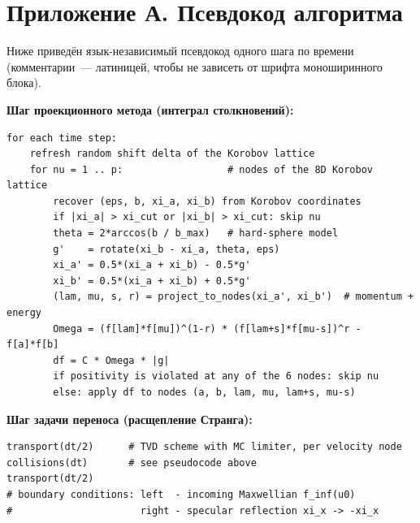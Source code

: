 \chapter*{Приложение А. Псевдокод алгоритма} %

Ниже приведён язык-независимый псевдокод одного шага по времени (комментарии~--- латиницей, чтобы не зависеть от шрифта
моноширинного блока). %

\medskip
\noindent\textbf{Шаг проекционного метода (интеграл столкновений):}
{\footnotesize
\begin{verbatim}
for each time step:
    refresh random shift delta of the Korobov lattice
    for nu = 1 .. p:                  # nodes of the 8D Korobov lattice
        recover (eps, b, xi_a, xi_b) from Korobov coordinates
        if |xi_a| > xi_cut or |xi_b| > xi_cut: skip nu
        theta = 2*arccos(b / b_max)   # hard-sphere model
        g'    = rotate(xi_b - xi_a, theta, eps)
        xi_a' = 0.5*(xi_a + xi_b) - 0.5*g'
        xi_b' = 0.5*(xi_a + xi_b) + 0.5*g'
        (lam, mu, s, r) = project_to_nodes(xi_a', xi_b')  # momentum + energy
        Omega = (f[lam]*f[mu])^(1-r) * (f[lam+s]*f[mu-s])^r - f[a]*f[b]
        df = C * Omega * |g|
        if positivity is violated at any of the 6 nodes: skip nu
        else: apply df to nodes (a, b, lam, mu, lam+s, mu-s)
\end{verbatim}
}

\medskip
\noindent\textbf{Шаг задачи переноса (расщепление Странга):}
{\footnotesize
\begin{verbatim}
transport(dt/2)      # TVD scheme with MC limiter, per velocity node
collisions(dt)       # see pseudocode above
transport(dt/2)
# boundary conditions: left  - incoming Maxwellian f_inf(u0)
#                      right - specular reflection xi_x -> -xi_x
\end{verbatim}
}
